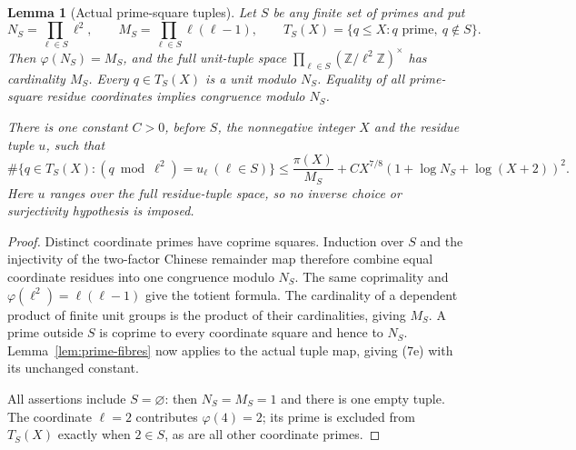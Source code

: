 \documentclass[11pt]{article}
\newtheorem{lemma}{Lemma}
\begin{document}
\begin{lemma}[Actual prime-square tuples]\label{lem:prime-square-tuples}
Let \(S\) be any finite set of primes and put
\[
 N_S=\prod_{\ell\in S}\ell^2,\qquad
 M_S=\prod_{\ell\in S}\ell(\ell-1),\qquad
 T_S(X)=\{q\le X:q\text{ prime},\ q\notin S\}.
\]
Then \(\varphi(N_S)=M_S\), and the full unit-tuple space
\(\prod_{\ell\in S}(\mathbb Z/\ell^2\mathbb Z)^\times\)
has cardinality \(M_S\). Every \(q\in T_S(X)\) is a unit modulo
\(N_S\). Equality of all prime-square residue coordinates implies
congruence modulo \(N_S\).

There is one constant \(C>0\), before \(S\), the nonnegative integer
\(X\) and the residue tuple \(u\), such that
\[
 \#\{q\in T_S(X):(q\bmod\ell^2)=u_\ell\ (\ell\in S)\}
 \le\frac{\pi(X)}{M_S}
 +C X^{7/8}(1+\log N_S+\log(X+2))^2.              \tag{7e}
\]
Here \(u\) ranges over the full residue-tuple space, so no inverse
choice or surjectivity hypothesis is imposed.
\end{lemma}
\begin{proof}
Distinct coordinate primes have coprime squares. Induction over \(S\)
and the injectivity of the two-factor Chinese remainder map therefore
combine equal coordinate residues into one congruence modulo \(N_S\).
The same coprimality and
\(\varphi(\ell^2)=\ell(\ell-1)\) give the totient formula.
The cardinality of a dependent product of finite unit groups is the
product of their cardinalities, giving \(M_S\).
A prime outside \(S\) is coprime to every coordinate square and hence
to \(N_S\). Lemma~\ref{lem:prime-fibres} now applies to the actual tuple
map, giving (7e) with its unchanged constant.

All assertions include \(S=\varnothing\): then \(N_S=M_S=1\)
and there is one empty tuple. The coordinate \(\ell=2\) contributes
\(\varphi(4)=2\); its prime is excluded from \(T_S(X)\) exactly when
\(2\in S\), as are all other coordinate primes.
\end{proof}
\end{document}
